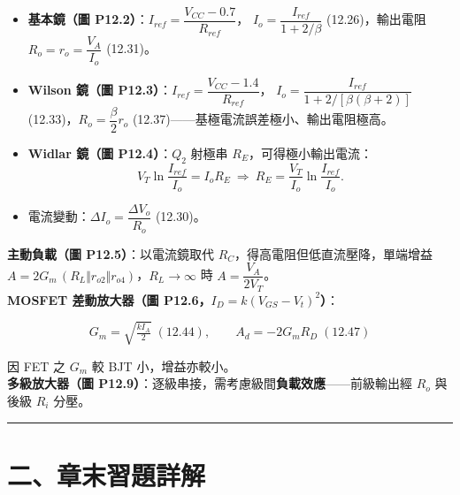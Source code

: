 \documentclass[12pt]{article}
\begin{document}
\begin{keybox}
\begin{itemize}[leftmargin=2.0em,itemsep=2pt]
  \item \textbf{基本鏡（圖 P12.2）}：$I_{ref}=\dfrac{V_{CC}-0.7}{R_{ref}}$，
        $I_o=\dfrac{I_{ref}}{1+2/\beta}$ (12.26)，輸出電阻 $R_o=r_o=\dfrac{V_A}{I_o}$ (12.31)。
  \item \textbf{Wilson 鏡（圖 P12.3）}：$I_{ref}=\dfrac{V_{CC}-1.4}{R_{ref}}$，
        $I_o=\dfrac{I_{ref}}{1+2/[\beta(\beta+2)]}$ (12.33)，$R_o=\dfrac{\beta}{2}r_o$ (12.37)——基極電流誤差極小、輸出電阻極高。
  \item \textbf{Widlar 鏡（圖 P12.4）}：$Q_2$ 射極串 $R_E$，可得極小輸出電流：
        \[ V_T\ln\frac{I_{ref}}{I_o}=I_oR_E\ \Rightarrow\ R_E=\frac{V_T}{I_o}\ln\frac{I_{ref}}{I_o}. \]
  \item 電流變動：$\Delta I_o=\dfrac{\Delta V_o}{R_o}$ (12.30)。
\end{itemize}
\end{keybox}

\begin{keybox}
\textbf{主動負載（圖 P12.5）}：以電流鏡取代 $R_C$，得高電阻但低直流壓降，單端增益
$A=2G_m\,(R_L\Vert r_{o2}\Vert r_{o4})$，$R_L\to\infty$ 時 $A=\dfrac{V_A}{2V_T}$。\\
\textbf{MOSFET 差動放大器（圖 P12.6，}$I_D=k(V_{GS}-V_t)^2$\textbf{）}：
\begin{formulabox}
\[ G_m=\sqrt{\tfrac{kI_A}{2}}\;(12.44),\qquad A_d=-2G_mR_D\;(12.47) \]
\end{formulabox}
因 FET 之 $G_m$ 較 BJT 小，增益亦較小。\\
\textbf{多級放大器（圖 P12.9）}：逐級串接，需考慮級間\textbf{負載效應}——前級輸出經 $R_o$ 與後級 $R_i$ 分壓。
\end{keybox}

\bigskip\hrule\vspace{0.6em}

\section*{二、章末習題詳解}
\medskip
\end{document}
